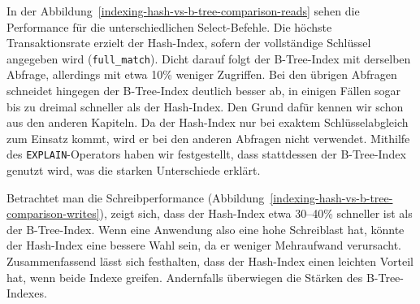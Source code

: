In der Abbildung~\ref{indexing-hash-vs-b-tree-comparison-reads} sehen die Performance für die unterschiedlichen Select-Befehle.
Die höchste Transaktionsrate erzielt der Hash-Index, sofern der vollständige Schlüssel angegeben wird (\texttt{full\_match}).
Dicht darauf folgt der B-Tree-Index mit derselben Abfrage, allerdings mit etwa 10\% weniger Zugriffen.
Bei den übrigen Abfragen schneidet hingegen der B-Tree-Index deutlich besser ab, in einigen Fällen sogar bis zu dreimal schneller als der Hash-Index.
Den Grund dafür kennen wir schon aus den anderen Kapiteln.
Da der Hash-Index nur bei exaktem Schlüsselabgleich zum Einsatz kommt, wird er bei den anderen Abfragen nicht verwendet.
Mithilfe des \texttt{EXPLAIN}-Operators haben wir festgestellt, dass stattdessen der B-Tree-Index genutzt wird, was die starken Unterschiede erklärt.

Betrachtet man die Schreibperformance (Abbildung~\ref{indexing-hash-vs-b-tree-comparison-writes}), zeigt sich, dass der Hash-Index etwa 30--40\% schneller ist als der B-Tree-Index.
Wenn eine Anwendung also eine hohe Schreiblast hat, könnte der Hash-Index eine bessere Wahl sein, da er weniger Mehraufwand verursacht.
Zusammenfassend lässt sich festhalten, dass der Hash-Index einen leichten Vorteil hat, wenn beide Indexe greifen.
Andernfalls überwiegen die Stärken des B-Tree-Indexes.

